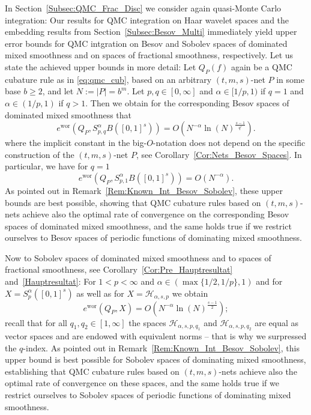 \documentclass[12pt]{article}
\DeclareMathOperator{\wor}{wor}
\begin{document}
In Section~\ref{Subsec:QMC_Frac_Disc} we consider again quasi-Monte Carlo integration: Our results for QMC integration on Haar wavelet spaces and the embedding results from Section~\ref{Subsec:Besov_Multi} immediately yield upper error bounds for QMC intgration on Besov and Sobolev spaces of dominated mixed smoothness and on spaces of fractional smoothness, respectively.
Let us state the achieved upper bounds in more detail:
Let $Q_P(f)$ again be a QMC cubature rule as in \eqref{eq:qmc_cub}, based on an arbitrary $(t,m,s)$-net $P$ in some base $b\ge 2$, and  let $N := |P| = b^m$.  Let $p,q\in [0,\infty]$ and 
$\alpha \in [1/p,1)$ if $q=1$ and $\alpha \in (1/p,1)$ if $q>1$. Then we obtain for the corresponding Besov spaces of dominated mixed smoothness that
\begin{equation*}
e^{\wor}(Q_P, S^{\alpha}_{p,q}B([0,1]^s)) = O \left( N^{-\alpha} \ln(N)^{\frac{s-1}{q'}} \right).
\end{equation*}   
where %
the implicit constant in the big-$O$-notation %
does not depend on the specific construction of the $(t,m,s)$-net $P$, see Corollary~\ref{Cor:Nets_Besov_Spaces}. In particular, we have for $q=1$ %
\begin{equation*}
e^{\wor}(Q_P, S^{\alpha}_{p,1}B([0,1]^s))  = O \left( N^{-\alpha} \right).
\end{equation*}   
As pointed out in Remark~\ref{Rem:Known_Int_Besov_Sobolev}, 
these upper bounds are best possible, showing that QMC cubature rules based on $(t,m,s)$-nets achieve also the optimal rate of convergence on the corresponding Besov spaces of dominated mixed smoothness, and the same holds true if we restrict ourselves to Besov spaces of periodic functions of dominating mixed smoothness.

Now to Sobolev spaces of dominated mixed smoothness and to spaces of fractional smoothness,
see Corollary~\ref{Cor:Pre_Hauptresultat}
and~\ref{Hauptresultat}:
For $1<p<\infty$ and $\alpha \in (\max\{1/2, 1/p\}, 1)$ and for $X= S^\alpha_p([0,1]^s)$ as well as for 
$X= \mathcal{H}_{\alpha, s,p}$ we obtain
\begin{equation*}
e^{\wor}(Q_P, X) %
= O \left( N^{-\alpha} \ln(N)^{\frac{s-1}{2}} \right);
\end{equation*}
recall that for all $q_1, q_2 \in [1,\infty]$ the spaces $\mathcal{H}_{\alpha, s,p, q_1}$ and $\mathcal{H}_{\alpha, s,p,q_2}$ are equal as vector spaces and are endowed with equivalent norms -- that is why we surpressed the $q$-index.
As pointed out in Remark~\ref{Rem:Known_Int_Besov_Sobolev}, 
this upper bound is best possible for Sobolev spaces of dominating mixed smoothness, establishing that QMC cubature rules based on $(t,m,s)$-nets achieve also the optimal rate of convergence on these spaces, and the same holds true if we restrict ourselves to Sobolev spaces of periodic functions of dominating mixed smoothness.
\end{document}
